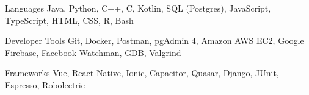 

\begin{cvskills}


  \cvskill
    {Languages} %
    {Java, Python, C++, C, Kotlin, SQL (Postgres), JavaScript, TypeScript, HTML, CSS, R, Bash} %

  \cvskill
    {Developer Tools} %
    {Git, Docker, Postman, pgAdmin 4, Amazon AWS EC2, Google Firebase, Facebook Watchman, GDB, Valgrind} %

  \cvskill
  {Frameworks} %
  {Vue, React Native, Ionic, Capacitor, Quasar, Django, JUnit, Espresso, Robolectric} %

\end{cvskills}
